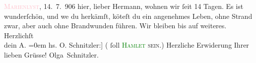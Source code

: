           \pstart
           \textsc{{\pb}\textcolor{pink}{Marienlyst}{}\ledrightnote{\textcolor{pink}{Marienlyst}}}, 14. 7. 906\pend
           \pstart
           hier, lieber Hermann, wohnen wir ſeit 14 Tagen. Es ist wunderſchön,
               und we{\geminationn} du herkämſt, kö{\geminationn}teſt du ein angenehmes Leben, ohne Strand zwar, aber auch ohne Brandwunden führen.
               Wir bleiben bis auf weiteres.\pend
           \pstart
           Herzlichſt{\\[\baselineskip]}dein \spacefill\mbox{A.}\pend
           \leftskip=0em{}\pstart
           \noindent{}{\pb}{[}hs. O. Schnitzler:{]} (\label{T_L01612_1v}\label{T_L01612_1h} ſoll \textsc{\textcolor{green}{Hamlet}{} sein.})\pend
           \pstart Herzliche Erwiderung Ihrer lieben Grüsse!
               { }\spacefill\mbox{Olga Schnitzler.}\pend{}\endnumbering{}  
      